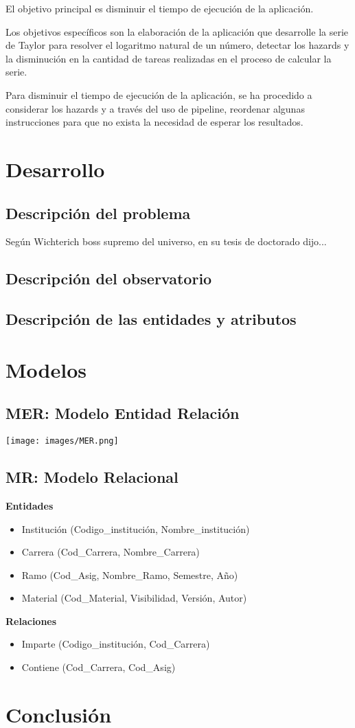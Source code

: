 \documentclass[12pt,letterpaper]{article}
\begin{document}
El objetivo principal es disminuir el tiempo de ejecución de la aplicación.

Los objetivos específicos son la elaboración de la aplicación que desarrolle la serie de Taylor para resolver el logaritmo natural de un número, detectar los hazards y la disminución en la cantidad de tareas realizadas en el proceso de calcular la serie.

Para disminuir el tiempo de ejecución de la aplicación, se ha procedido a considerar los hazards y a través del uso de pipeline, reordenar algunas instrucciones para que no exista la necesidad de esperar los resultados.

\newpage
\section{Desarrollo}
\subsection{Descripción del problema}
Según Wichterich boss supremo del universo, en su tesis de doctorado \cite{Wichterich2010} dijo...
\lipsum[1-3]

\subsection{Descripción del observatorio}
\lipsum[1-3]

\subsection{Descripción de las entidades y atributos}
\lipsum[1-3]

\newpage
\section{Modelos}
\subsection{MER: Modelo Entidad Relación}
\texttt{[image: images/MER.png]}

\subsection{MR: Modelo Relacional}
\textbf{Entidades}

\begin{itemize}
\item Institución (Codigo\_institución, Nombre\_institución)
\item Carrera (Cod\_Carrera, Nombre\_Carrera)
\item Ramo (Cod\_Asig, Nombre\_Ramo, Semestre, Año)
\item Material (Cod\_Material, Visibilidad, Versión, Autor)
\end{itemize}

\textbf{Relaciones}
\begin{itemize}
\item Imparte (Codigo\_institución, Cod\_Carrera)
\item Contiene (Cod\_Carrera, Cod\_Asig)
\end{itemize}

\newpage
\section{Conclusión}
\lipsum[1-3]

\newpage
{}


\end{document}
